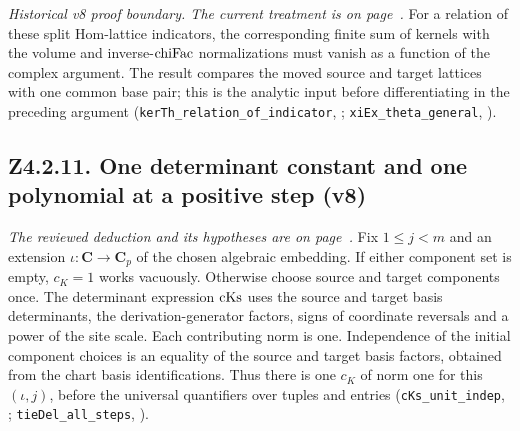 \emph{Historical v8 proof boundary. The current treatment is on page~\pageref{r8:Z4.2.09}.} For a relation of these split Hom-lattice indicators, the corresponding finite sum of kernels with the volume and inverse-\({\rm chiFac}\) normalizations must vanish as a function of the complex argument. The result compares the moved source and target lattices with one common base pair; this is the analytic input before differentiating in the preceding argument (\nolinkurl{kerTh_relation_of_indicator}, ; \nolinkurl{xiEx_theta_general}, ).

\subsection{Z4.2.11. One determinant constant and one polynomial at a positive step (v8)}\label{r6:Z4.2.11}
\emph{The reviewed deduction and its hypotheses are on page~\pageref{r8:Z4.2.11}.}
Fix \(1\le j<m\) and an extension \(\iota:\mathbf C\to\mathbf C_p\) of the chosen algebraic embedding. If either component set is empty, \(c_K=1\) works vacuously. Otherwise choose source and target components once. The determinant expression \({\rm cKs}\) uses the source and target basis determinants, the derivation-generator factors, signs of coordinate reversals and a power of the site scale. Each contributing norm is one. Independence of the initial component choices is an equality of the source and target basis factors, obtained from the chart basis identifications. Thus there is one \(c_K\) of norm one for this \((\iota,j)\), before the universal quantifiers over tuples and entries (\nolinkurl{cKs_unit_indep}, ; \nolinkurl{tieDel_all_steps}, ).

